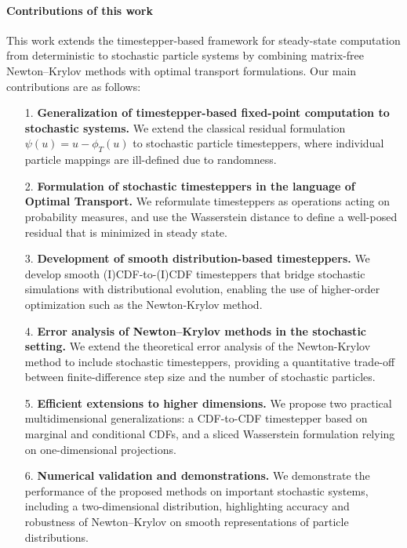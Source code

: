 \documentclass{article}
\begin{document}
\paragraph{Contributions of this work}
This work extends the timestepper-based framework for steady-state computation from deterministic to stochastic particle systems by combining matrix-free Newton–Krylov methods with optimal transport formulations. Our main contributions are as follows:
\begin{itemize}
    \item[1.] \textbf{Generalization of timestepper-based fixed-point computation to stochastic systems.} We extend the classical residual formulation $\psi(u) = u - \phi_T(u)$ to stochastic particle timesteppers, where individual particle mappings are ill-defined due to randomness.
    \item[2.] \textbf{Formulation of stochastic timesteppers in the language of Optimal Transport.} We reformulate timesteppers as operations acting on probability measures, and use the Wasserstein distance to define a well-posed residual that is minimized in steady state.
    \item[3.] \textbf{Development of smooth distribution-based timesteppers.} We develop smooth (I)CDF-to-(I)CDF timesteppers that bridge stochastic simulations with distributional evolution, enabling the use of higher-order optimization such as the Newton-Krylov method.
    \item[4.] \textbf{Error analysis of Newton–Krylov methods in the stochastic setting.}  We extend the theoretical error analysis of the Newton-Krylov method to include stochastic timesteppers, providing a quantitative trade-off between finite-difference step size and the number of stochastic particles.
    \item[5.] \textbf{Efficient extensions to higher dimensions.} We propose two practical multidimensional generalizations: a CDF-to-CDF timestepper based on marginal and conditional CDFs, and a sliced Wasserstein formulation relying on one-dimensional projections.
    \item[6.] \textbf{Numerical validation and demonstrations.} We demonstrate the performance of the proposed methods on important stochastic systems, including a two-dimensional distribution, highlighting accuracy and robustness of Newton--Krylov on smooth representations of particle distributions.
\end{itemize}
\end{document}
